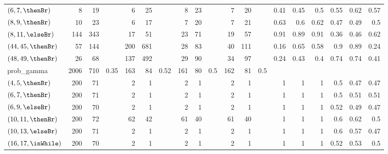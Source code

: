 \begin{table}
\begin{tabular}{l|rrr|rrr|rrr|rrr|rrrrrr}
    $(6,7,\thenBr)$    & 8    & 19    &                  & 6   & 25   &                    & 8   & 23  &                       & 7   & 20  & & 0.41 & 0.45 & 0.5  & 0.55 & 0.62 & 0.57 \\
    $(8,9,\thenBr)$    & 10   & 23    &                  & 6   & 17   &                    & 7   & 20  &                       & 7   & 21  & & 0.63 & 0.6  & 0.62 & 0.47 & 0.49 & 0.5 \\
    $(8,11,\elseBr)$   & 144  & 343   &                  & 17  & 51   &                    & 23  & 71  &                       & 19  & 57  & & 0.91 & 0.89 & 0.91 & 0.36 & 0.46 & 0.62 \\
    $(44,45,\thenBr)$  & 57   & 144   &                  & 200 & 681  &                    & 28  & 83  &                       & 40  & 111 & & 0.16 & 0.65 & 0.58 & 0.9  & 0.89 & 0.24 \\
    $(48,49,\thenBr)$  & 26   & 68    &                  & 137 & 492  &                    & 29  & 90  &                       & 34  & 97  & & 0.24 & 0.43 & 0.4  & 0.74 & 0.74 & 0.41 \\
    \midrule
    \midrule
    prob\_gamma        & 2006 & 710  & 0.35              & 163 & 84   & 0.52               & 161 & 80 & 0.5                    & 162 & 81  & 0.5 & & & & & & \\
    $(4,5,\thenBr)$    & 200  & 71   &                   & 2   & 1    &                    & 2   & 1  &                        & 2   & 1   & & 1 & 1 & 1 & 0.5 & 0.47 & 0.47 \\
    $(6,7,\thenBr)$    & 200  & 71   &                   & 2   & 1    &                    & 2   & 1  &                        & 2   & 1   & & 1 & 1 & 1 & 0.5 & 0.51 & 0.51 \\
    $(6,9,\elseBr)$    & 200  & 70   &                   & 2   & 1    &                    & 2   & 1  &                        & 2   & 1   & & 1 & 1 & 1 & 0.52 & 0.49 & 0.47 \\
    $(10,11,\thenBr)$  & 200  & 72   &                   & 62  & 42   &                    & 61  & 40 &                        & 61  & 40  & & 1 & 1 & 1 & 0.6 & 0.62  & 0.5 \\
    $(10,13,\elseBr)$  & 200  & 71   &                   & 2   & 1    &                    & 2   & 1  &                        & 2   & 1   & & 1 & 1 & 1 & 0.6 & 0.57 & 0.47 \\
    $(16,17,\inWhile)$ & 200  & 70   &                   & 2   & 1    &                    & 2   & 1  &                        & 2   & 1   & & 1 & 1 & 1 & 0.52 & 0.53 & 0.5 \\

\end{tabular}
\end{table}
